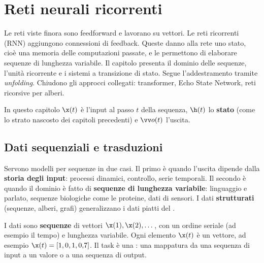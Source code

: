 \chapter{Reti neurali ricorrenti}
\label{cap:rnn}

\begin{inbreve}
Le reti viste finora sono feedforward e lavorano su vettori. Le reti ricorrenti (RNN) aggiungono connessioni di
feedback. Queste danno alla rete uno stato, cioè una memoria delle computazioni passate, e le permettono di
elaborare sequenze di lunghezza variabile. Il capitolo presenta il dominio delle sequenze, l'unità ricorrente e i
sistemi a transizione di stato. Segue l'addestramento tramite \emph{unfolding}. Chiudono gli approcci collegati:
transformer, Echo State Network, reti ricorsive per alberi.
\end{inbreve}

\begin{attenzione}[Notazione]
In questo capitolo $\x(t)$ è l'input al passo $t$ della sequenza, $\h(t)$ lo \textbf{stato} (come lo strato nascosto
dei capitoli precedenti) e $\vv o(t)$ l'uscita.
\end{attenzione}

\section{Dati sequenziali e trasduzioni}

Servono modelli per sequenze in due casi. Il primo è quando l'uscita dipende dalla \textbf{storia degli input}:
processi dinamici, controllo, serie temporali. Il secondo è quando il dominio è fatto di \textbf{sequenze di
lunghezza variabile}: linguaggio e parlato, sequenze biologiche come le proteine, dati di sensori. I dati
\textbf{strutturati} (sequenze, alberi, grafi) generalizzano i dati piatti del .

\begin{definizione}
I dati sono \textbf{sequenze} di vettori $\x(1),\x(2),\dots$, con un ordine seriale (ad esempio il tempo) e
lunghezza variabile. Ogni elemento $\x(t)$ è un vettore, ad esempio $\x(t) = [1,0,1,0{,}7]$. Il task è una
: una mappatura da una sequenza di input a un valore o a una sequenza di output.
\end{definizione}


